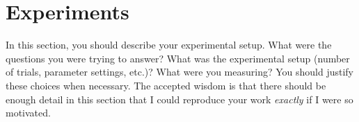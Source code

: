 
\section{Experiments}
\label{sec:expts}

In this section, you should describe your experimental setup. What
were the questions you were trying to answer? What was the
experimental setup (number of trials, parameter settings, etc.)? What
were you measuring? You should justify these choices when
necessary. The accepted wisdom is that there should be enough detail
in this section that I could reproduce your work \emph{exactly} if I
were so motivated.

